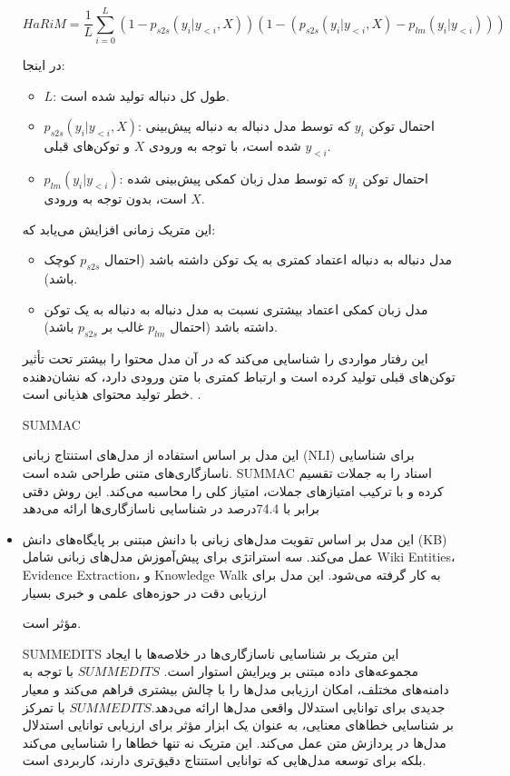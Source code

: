 \begin{itemize}
{\begin{equation}
	\text{$HaRiM$} = \frac{1}{L} \sum_{i=0}^{L} \left(1 - p_{{s2s}}(y_i | y_{<i}, X)\right) \left(1 - \left(p_{{s2s}}(y_i | y_{<i}, X) - p_{{lm}}(y_i | y_{<i})\right)\right)
\end{equation}

در اینجا:
\begin{itemize}
	\item $L$: طول کل دنباله تولید شده است.
	\item $p_{{s2s}}(y_i | y_{<i}, X)$: احتمال توکن $y_i$ که توسط مدل دنباله به دنباله پیش‌بینی شده است، با توجه به ورودی $X$ و توکن‌های قبلی $y_{<i}$.
	\item $p_{{lm}}(y_i | y_{<i})$: احتمال توکن $y_i$ که توسط مدل زبان کمکی پیش‌بینی شده است، بدون توجه به ورودی $X$.
\end{itemize}

این متریک زمانی افزایش می‌یابد که:
\begin{itemize}
	\item مدل دنباله به دنباله اعتماد کمتری به یک توکن داشته باشد (احتمال $p_{{s2s}}$ کوچک باشد).
	\item مدل زبان کمکی اعتماد بیشتری نسبت به مدل دنباله به دنباله به یک توکن داشته باشد (احتمال $p_{{lm}}$ غالب بر $p_{{s2s}}$ باشد).
\end{itemize}

این رفتار مواردی را شناسایی می‌کند که در آن مدل محتوا را بیشتر تحت تأثیر توکن‌های قبلی تولید کرده است و ارتباط کمتری با متن ورودی دارد، که نشان‌دهنده خطر تولید محتوای هذیانی است.
\cite{son_harim_2022}.
}
	
	\item [SUMMAC]{
	
	
	این مدل بر اساس استفاده از مدل‌های استنتاج زبانی (NLI) برای شناسایی ناسازگاری‌های متنی طراحی شده است. SUMMAC اسناد را به جملات تقسیم کرده و با ترکیب امتیازهای جملات، امتیاز کلی را محاسبه می‌کند. این روش دقتی برابر با 74.4درصد در شناسایی ناسازگاری‌ها ارائه می‌دهد​}
	\item {این مدل بر اساس تقویت مدل‌های زبانی با دانش مبتنی بر پایگاه‌های دانش (KB) عمل می‌کند. سه استراتژی برای پیش‌آموزش مدل‌های زبانی شامل Wiki Entities، Evidence Extraction، و Knowledge Walk به کار گرفته می‌شود. این مدل برای ارزیابی دقت در حوزه‌های علمی و خبری بسیار 
		
	مؤثر است\cite{laban_span_2022}.}
	

	
	
	\item[SUMMEDITS] {
	این متریک بر شناسایی ناسازگاری‌ها در خلاصه‌ها با ایجاد مجموعه‌های داده مبتنی بر ویرایش استوار است. $SUMMEDITS$ با توجه به دامنه‌های مختلف، امکان ارزیابی مدل‌ها را با چالش بیشتری فراهم می‌کند و معیار جدیدی برای توانایی استدلال واقعی مدل‌ها ارائه می‌دهد.$SUMMEDITS$ با تمرکز بر شناسایی خطاهای معنایی، به عنوان یک ابزار مؤثر برای ارزیابی توانایی استدلال مدل‌ها در پردازش متن عمل می‌کند. این متریک نه تنها خطاها را شناسایی می‌کند بلکه برای توسعه مدل‌هایی که توانایی استنتاج دقیق‌تری دارند، کاربردی است\cite{laban_summedits_2023}.}

	
	
	
	
\end{itemize}
